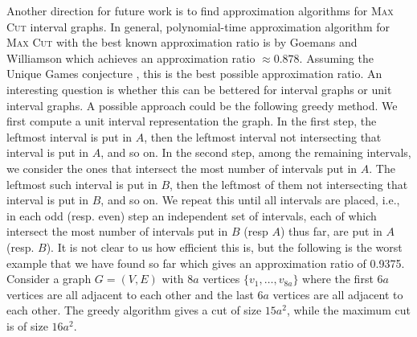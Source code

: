 \documentclass[11pt]{article}
\begin{document}
Another direction for future work is to find approximation algorithms for \textsc{Max Cut} interval graphs. In general, polynomial-time approximation algorithm for \textsc{Max Cut} with the best known approximation ratio is by Goemans and Williamson \cite{goemans1995improved} which achieves an approximation ratio $\approx 0.878$. Assuming the Unique Games conjecture \cite{khot2002power}, this is the best possible approximation ratio. An interesting question is whether this can be bettered for interval graphs or unit interval graphs. A possible approach could be the following greedy method. We first compute a unit interval representation the graph. In the first step, the leftmost interval is put in $A$, then the leftmost interval not intersecting that interval is put in $A$, and so on. In the second step, among the remaining intervals, we consider the ones that intersect the most number of intervals put in $A$. The leftmost such interval is put in $B$, then the leftmost of them not intersecting that interval is put in $B$, and so on. We repeat this until all intervals are placed, i.e., in each odd (resp. even) step an independent set of intervals, each of which intersect the most number of intervals put in $B$ (resp $A$) thus far, are put in $A$ (resp. $B$). It is not clear to us how efficient this is, but the following is the worst example that we have found so far which gives an approximation ratio of 0.9375. Consider a graph $G = (V,E)$ with $8a$ vertices $\{v_1, \ldots, v_{8a}\}$ where the first $6a$ vertices are all adjacent to each other and the last $6a$ vertices are all adjacent to each other. The greedy algorithm gives a cut of size $15a^2$, while the maximum cut is of size $16a^2$.   


 





 
\end{document}
